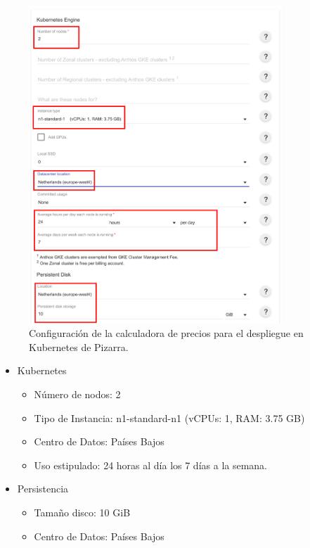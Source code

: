 \documentclass[11pt,spanish,listoffigures,listoftables]{tfgetsinf}
\begin{document}
\begin{figure}[ht]
	\centering
	\includegraphics[width=0.85\textwidth]{img/google-cloud-engine-cluster-cost}
	\caption[Calculadora de precios en GCE]{Configuración de la calculadora de precios para el despliegue en Kubernetes de Pizarra.}
	\label{figura:gce-estimated-cost}
\end{figure}

\begin{itemize}
	\item  Kubernetes
	\begin{itemize}
		\item Número de nodos: 2
		\item Tipo de Instancia: n1-standard-n1 (vCPUs: 1, RAM: 3.75 GB)
		\item Centro de Datos: Países Bajos 
	    \item Uso estipulado: 24 horas al día los 7 días a la semana.
	 \end{itemize}
    \item Persistencia
	\begin{itemize}
		\item Tamaño disco: 10 GiB
		\item Centro de Datos: Países Bajos
    \end{itemize}
\end{itemize}
\end{document}
